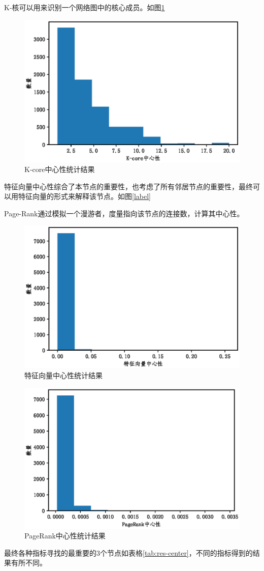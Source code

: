 \documentclass[10pt, a4paper]{article}
\begin{document}
K-核可以用来识别一个网络图中的核心成员。如图\ref{fig:K-core中心性}

\begin{figure}[tbph!]
	\centering
	\includegraphics[width=0.5\linewidth]{figures/K-core中心性}
	\caption{K-core中心性统计结果}
	\label{fig:K-core中心性}
\end{figure}

特征向量中心性综合了本节点的重要性，也考虑了所有邻居节点的重要性，最终可以用特征向量的形式来解释该节点。如图\ref{label}

Page-Rank通过模拟一个漫游者，度量指向该节点的连接数，计算其中心性。
\begin{figure}[tbph!]
	\centering
	\includegraphics[width=0.5\linewidth]{figures/特征向量中心性}
	\caption{特征向量中心性统计结果}
	\label{fig:特征向量中心性}
\end{figure}
\begin{figure}[tbph!]
\centering
\includegraphics[width=0.5\linewidth]{figures/PageRank中心性}
\caption{PageRank中心性统计结果}
\label{fig:PageRank中心性}
\end{figure}

最终各种指标寻找的最重要的3个节点如表格\ref{tab:res-center}，不同的指标得到的结果有所不同。
\end{document}
